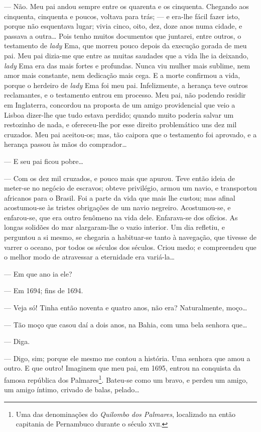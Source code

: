 --- Não. Meu pai andou sempre entre os quarenta e os cinquenta. Chegando
aos cinquenta, cinquenta e poucos, voltava para trás; --- e era-lhe
fácil fazer isto, porque não esquentava lugar; vivia cinco, oito, dez,
doze anos numa cidade, e passava a outra\ldots{} Pois tenho muitos documentos
que juntarei, entre outros, o testamento de \emph{lady} Ema, que morreu
pouco depois da execução gorada de meu pai. Meu pai dizia-me que entre
as muitas saudades que a vida lhe ia deixando, \emph{lady} Ema era das
mais fortes e profundas. Nunca viu mulher mais sublime, nem amor mais
constante, nem dedicação mais cega. E a morte confirmou a vida, porque o
herdeiro de \emph{lady} Ema foi meu pai. Infelizmente, a herança teve
outros reclamantes, e o testamento entrou em processo. Meu pai, não
podendo residir em Inglaterra, concordou na proposta de um amigo
providencial que veio a Lisboa dizer-lhe que tudo estava perdido; quando
muito poderia salvar um restozinho de nada, e ofereceu-lhe por esse
direito problemático uns dez mil cruzados. Meu pai aceitou-os; mas, tão
caipora que o testamento foi aprovado, e a herança passou às mãos do
comprador\ldots{}

--- E seu pai ficou pobre\ldots{}

--- Com os dez mil cruzados, e pouco mais que apurou. Teve então ideia
de meter-se no negócio de escravos; obteve privilégio, armou um navio, e
transportou africanos para o Brasil. Foi a parte da vida que mais lhe
custou; mas afinal acostumou-se às tristes obrigações de um navio
negreiro. Acostumou-se, e enfarou-se, que era outro fenômeno na vida
dele. Enfarava-se dos ofícios. As longas solidões do mar alargaram-lhe o
vazio interior. Um dia refletiu, e perguntou a si mesmo, se chegaria a
habituar-se tanto à navegação, que tivesse de varrer o oceano, por todos
os séculos dos séculos. Criou medo; e compreendeu que o melhor modo de
atravessar a eternidade era variá-la\ldots{}

--- Em que ano ia ele?

--- Em 1694; fins de 1694.

--- Veja só! Tinha então noventa e quatro anos, não era? Naturalmente,
moço\ldots{}

--- Tão moço que casou daí a dois anos, na Bahia, com uma bela senhora
que\ldots{}

--- Diga.

--- Digo, sim; porque ele mesmo me contou a história. Uma senhora que
amou a outro. E que outro! Imaginem que meu pai, em 1695, entrou na
conquista da famosa república dos Palmares\footnote{Uma das denominações
  do \emph{Quilombo dos Palmares}, localizado na então capitania de
  Pernambuco durante o século \textsc{xvii}.}. Bateu-se como um bravo, e perdeu
um amigo, um amigo íntimo, crivado de balas, pelado\ldots{}

